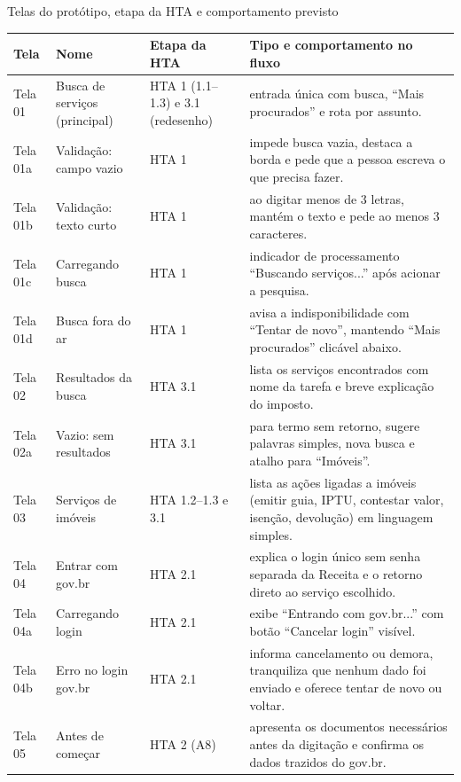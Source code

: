 \documentclass[
  12pt,
  oneside,
  a4paper,
  chapter=TITLE,
  section=TITLE,
  english,
  brazilian
]{abntex2}
\begin{document}
\begin{quadro}[!htbp]
  \caption{Telas do protótipo, etapa da HTA e comportamento previsto}\label{qua:telas}
  \centering\footnotesize
  \begin{tabularx}{\textwidth}{|P{1.4cm}|P{3.6cm}|P{2.3cm}|Y|}\hline
    Tela & Nome & Etapa da HTA & Tipo e comportamento no fluxo \\\hline
    Tela 01 & Busca de serviços (principal) & HTA 1 (1.1--1.3) e 3.1 (redesenho) & entrada única com busca, ``Mais procurados'' e rota por assunto. \\\hline
    Tela 01a & Validação: campo vazio & HTA 1 & impede busca vazia, destaca a borda e pede que a pessoa escreva o que precisa fazer. \\\hline
    Tela 01b & Validação: texto curto & HTA 1 & ao digitar menos de 3 letras, mantém o texto e pede ao menos 3 caracteres. \\\hline
    Tela 01c & Carregando busca & HTA 1 & indicador de processamento ``Buscando serviços...'' após acionar a pesquisa. \\\hline
    Tela 01d & Busca fora do ar & HTA 1 & avisa a indisponibilidade com ``Tentar de novo'', mantendo ``Mais procurados'' clicável abaixo. \\\hline
    Tela 02 & Resultados da busca & HTA 3.1 & lista os serviços encontrados com nome da tarefa e breve explicação do imposto. \\\hline
    Tela 02a & Vazio: sem resultados & HTA 3.1 & para termo sem retorno, sugere palavras simples, nova busca e atalho para ``Imóveis''. \\\hline
    Tela 03 & Serviços de imóveis & HTA 1.2--1.3 e 3.1 & lista as ações ligadas a imóveis (emitir guia, IPTU, contestar valor, isenção, devolução) em linguagem simples. \\\hline
    Tela 04 & Entrar com gov.br & HTA 2.1 & explica o login único sem senha separada da Receita e o retorno direto ao serviço escolhido. \\\hline
    Tela 04a & Carregando login & HTA 2.1 & exibe ``Entrando com gov.br...'' com botão ``Cancelar login'' visível. \\\hline
    Tela 04b & Erro no login gov.br & HTA 2.1 & informa cancelamento ou demora, tranquiliza que nenhum dado foi enviado e oferece tentar de novo ou voltar. \\\hline
    Tela 05 & Antes de começar & HTA 2 (A8) & apresenta os documentos necessários antes da digitação e confirma os dados trazidos do gov.br. \\\hline

\end{tabularx}
\end{quadro}
\end{document}
